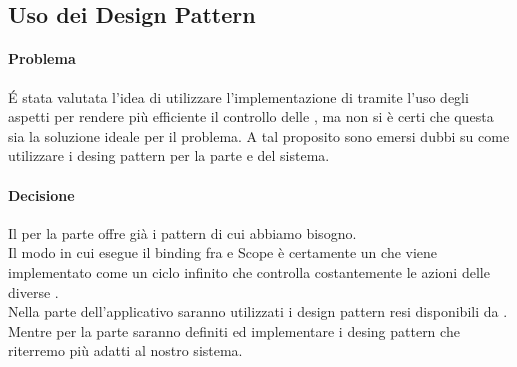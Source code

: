\subsection{Uso dei Design Pattern}
\paragraph{Problema}
\'E stata valutata l'idea di utilizzare l’implementazione di  tramite l’uso degli aspetti per rendere più efficiente il controllo delle , ma non si è certi che questa sia la soluzione ideale per il problema. A tal proposito sono emersi dubbi su come utilizzare i desing pattern per la parte  e  del sistema.
\paragraph{Decisione}
Il  per la parte  offre già i pattern di cui abbiamo bisogno. \\ Il modo in cui  esegue il binding fra  e Scope è certamente un  che viene implementato come un ciclo infinito che controlla costantemente le azioni delle diverse . \\
Nella parte  dell'applicativo saranno utilizzati i design pattern resi disponibili da . \\
Mentre per la parte  saranno definiti ed implementare i desing pattern che riterremo più adatti al nostro sistema.
